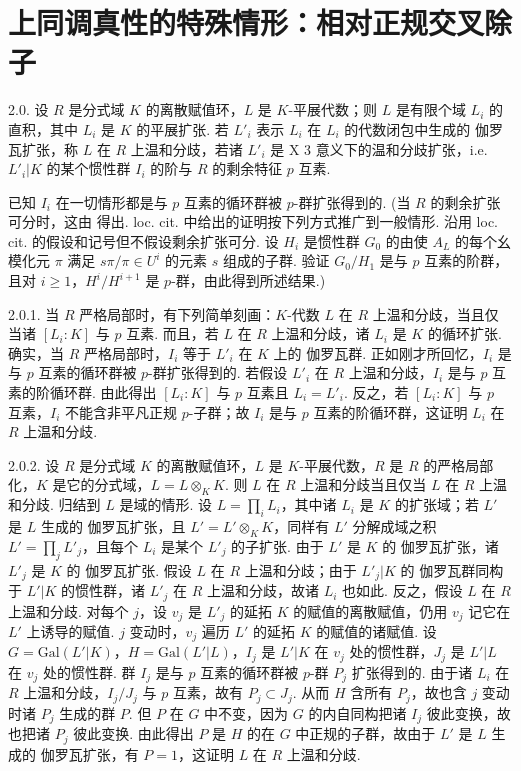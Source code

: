 \section{上同调真性的特殊情形：相对正规交叉除子}

2.0. 设 $R$ 是分式域 $K$ 的离散赋值环，$L$ 是 $K$-平展代数；则 $L$ 是有限个域 $L_i$ 的直积，其中 $L_i$ 是 $K$ 的平展扩张. 若 $L'_i$ 表示 $L_i$ 在 $L_i$ 的代数闭包中生成的 伽罗瓦扩张，称 $L$ 在 $R$ 上温和分歧，若诸 $L'_i$ 是 X 3 意义下的温和分歧扩张，i.e. $L'_i|K$ 的某个惯性群 $I_i$ 的阶与 $R$ 的剩余特征 $p$ 互素.

已知 $I_i$ 在一切情形都是与 $p$ 互素的循环群被 $p$-群扩张得到的. (当 $R$ 的剩余扩张可分时，这由 \cite[第四章 命题 7 推论 4]{exp13-5} 得出. loc. cit. 中给出的证明按下列方式推广到一般情形. 沿用 loc. cit. 的假设和记号但不假设剩余扩张可分. 设 $H_i$ 是惯性群 $G_0$ 的由使 $A_L$ 的每个幺模化元 $\pi$ 满足 $s\pi/\pi \in U^i$ 的元素 $s$ 组成的子群. 验证 $G_0/H_1$ 是与 $p$ 互素的阶群，且对 $i \geqslant 1$，$H^i/H^{i+1}$ 是 $p$-群，由此得到所述结果.)

2.0.1. 当 $R$ 严格局部时，有下列简单刻画：$K$-代数 $L$ 在 $R$ 上温和分歧，当且仅当诸 $[L_i : K]$ 与 $p$ 互素. 而且，若 $L$ 在 $R$ 上温和分歧，诸 $L_i$ 是 $K$ 的循环扩张. 确实，当 $R$ 严格局部时，$I_i$ 等于 $L'_i$ 在 $K$ 上的 伽罗瓦群. 正如刚才所回忆，$I_i$ 是与 $p$ 互素的循环群被 $p$-群扩张得到的. 若假设 $L'_i$ 在 $R$ 上温和分歧，$I_i$ 是与 $p$ 互素的阶循环群. 由此得出 $[L_i : K]$ 与 $p$ 互素且 $L_i = L'_i$. 反之，若 $[L_i : K]$ 与 $p$ 互素，$I_i$ 不能含非平凡正规 $p$-子群；故 $I_i$ 是与 $p$ 互素的阶循环群，这证明 $L_i$ 在 $R$ 上温和分歧.

2.0.2. 设 $R$ 是分式域 $K$ 的离散赋值环，$L$ 是 $K$-平展代数，$R$ 是 $R$ 的严格局部化，$K$ 是它的分式域，$L = L \otimes_K K$. 则 $L$ 在 $R$ 上温和分歧当且仅当 $L$ 在 $R$ 上温和分歧. 归结到 $L$ 是域的情形. 设 $L = \prod_i L_i$，其中诸 $L_i$ 是 $K$ 的扩张域；若 $L'$ 是 $L$ 生成的 伽罗瓦扩张，且 $L' = L' \otimes_K K$，同样有 $L'$ 分解成域之积 $L' = \prod_j L'_j$，且每个 $L_i$ 是某个 $L'_j$ 的子扩张. 由于 $L'$ 是 $K$ 的 伽罗瓦扩张，诸 $L'_j$ 是 $K$ 的 伽罗瓦扩张. 假设 $L$ 在 $R$ 上温和分歧；由于 $L'_j|K$ 的 伽罗瓦群同构于 $L'|K$ 的惯性群，诸 $L'_j$ 在 $R$ 上温和分歧，故诸 $L_i$ 也如此. 反之，假设 $L$ 在 $R$ 上温和分歧. 对每个 $j$，设 $v_j$ 是 $L'_j$ 的延拓 $K$ 的赋值的离散赋值，仍用 $v_j$ 记它在 $L'$ 上诱导的赋值. $j$ 变动时，$v_j$ 遍历 $L'$ 的延拓 $K$ 的赋值的诸赋值. 设 $G = \mathrm{Gal}(L'|K)$，$H = \mathrm{Gal}(L'|L)$，$I_j$ 是 $L'|K$ 在 $v_j$ 处的惯性群，$J_j$ 是 $L'|L$ 在 $v_j$ 处的惯性群. 群 $I_j$ 是与 $p$ 互素的循环群被 $p$-群 $P_j$ 扩张得到的. 由于诸 $L_i$ 在 $R$ 上温和分歧，$I_j/J_j$ 与 $p$ 互素，故有 $P_j \subset J_j$. 从而 $H$ 含所有 $P_j$，故也含 $j$ 变动时诸 $P_j$ 生成的群 $P$. 但 $P$ 在 $G$ 中不变，因为 $G$ 的内自同构把诸 $I_j$ 彼此变换，故也把诸 $P_j$ 彼此变换. 由此得出 $P$ 是 $H$ 的在 $G$ 中正规的子群，故由于 $L'$ 是 $L$ 生成的 伽罗瓦扩张，有 $P = 1$，这证明 $L$ 在 $R$ 上温和分歧.

